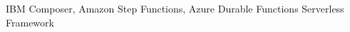\documentclass[11pt]{article}
\begin{document}
IBM Composer, Amazon Step Functions, Azure Durable Functions %
Serverless Framework 
\end{document}
